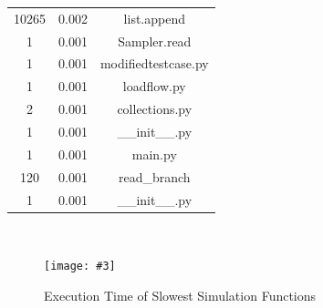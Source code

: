 \documentclass[a4paper,oneside,12pt]{report}
\newcommand{\image}[3] {
  \begin{figure}
    \begin{center}
      \texttt{[image: \#3]}
      \caption{#2}
      \label{#1}
    \end{center}
  \end{figure}
}
\begin{document}
\begin{table}[htbp]
\begin{tabular}{c||c||c}
10265  &  0.002  &  list.append  \\ 
1  &  0.001  &  Sampler.read  \\ 
1  &  0.001  &  modifiedtestcase.py  \\ 
1  &  0.001  &  loadflow.py  \\ 
2  &  0.001  &  collections.py  \\ 
1  &  0.001  &  \_\_init\_\_.py  \\ 
1  &  0.001  &  main.py  \\ 
120  &  0.001  &  read\_branch  \\ 
1  &  0.001  &  \_\_init\_\_.py  \\ 
\hline
\end{tabular}\\
\end{table}

\image{imgprofilesim}{Execution Time of Slowest Simulation Functions}{profilesim.png}
\end{document}
